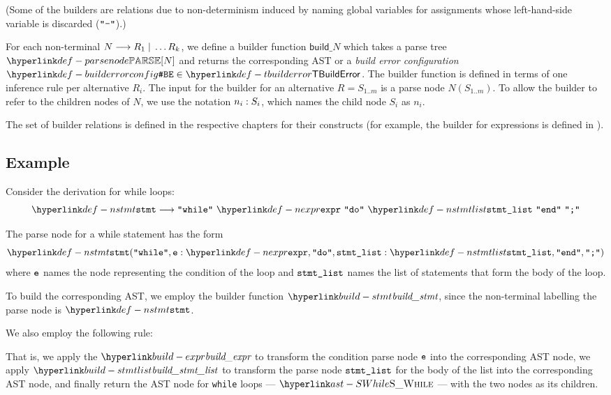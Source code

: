 (Some of the builders are relations due to non-determinism induced by naming global variables
for assignments whose left-hand-side variable is discarded ($\Tminus$).)

\hypertarget{def-tbuilderror}{}
\hypertarget{def-builderrorconfig}{}
For each non-terminal $N \derives R_1 \;|\; \ldots R_k$, we define a builder function
$\textsf{build\_}N $ which takes a parse tree $\parsenode{N}$ and returns the corresponding
AST or a \emph{build error configuration} $\BuildErrorConfig \in \TBuildError$.
The builder function is defined in terms of one inference rule per alternative $R_i$.
The input for the builder for an alternative $R = S_{1..m}$ is a parse node
$N(S_{1..m})$. To allow the builder to refer to the children nodes of $N$,
we use the notation $\namednode{n_i}{S_i}$, which names the child node $S_i$ as $n_i$.

The set of builder relations is defined in the respective chapters for their constructs
(for example, the builder for expressions is defined in ).

\subsection{Example}
Consider the derivation for while loops:
\[
\Nstmt \derives \Twhile \parsesep \Nexpr \parsesep \Tdo \parsesep \Nstmtlist \parsesep \Tend \parsesep \Tsemicolon
\]

The parse node for a while statement has the form
\[
\Nstmt(\Twhile, \namednode{\ve}{\Nexpr}, \Tdo, \namednode{\vstmtlist}{\Nstmtlist}, \Tend, \Tsemicolon)
\]
where $\ve$ names the node representing the condition of the loop and $\vstmtlist$ names
the list of statements that form the body of the loop.

To build the corresponding AST, we employ the builder function $\buildstmt$, since
the non-terminal labelling the parse node is $\Nstmt$.

We also employ the following rule:
\begin{mathpar}
\end{mathpar}
That is, we apply the $\buildexpr$ to transform the condition parse node $\ve$ into the corresponding AST node,
we apply $\buildstmtlist$ to transform the parse node $\vstmtlist$ for the body of the list into the corresponding AST node,
and finally return the AST node for \texttt{while} loops --- $\SWhile$ --- with the two nodes as its children.

